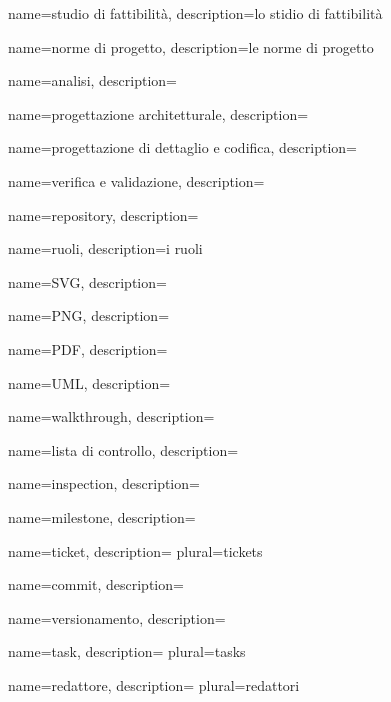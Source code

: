  {
	name=studio di fattibilità,
	description={lo stidio di fattibilità \TODO{}}
}

 {
	name=norme di progetto,
	description={le norme di progetto \TODO{}}
}

 {
	name=analisi,
	description={\TODO{}}
}

 {
	name=progettazione architetturale,
	description={\TODO{}}
}

 {
	name=progettazione di dettaglio e codifica,
	description={\TODO{}}
}

 {
	name=verifica e validazione,
	description={\TODO{}}
}

 {
	name=repository,
	description={\TODO{}}
}

 {
	name=ruoli,
	description={i ruoli\TODO{}}
}

 {
	name=SVG,
	description={\TODO{}}
}

 {
	name=PNG,
	description={\TODO{}}
}

 {
	name=PDF,
	description={\TODO{}}
}

 {
	name=UML,
	description={\TODO{}}
}

 {
	name=walkthrough,
	description={\TODO{}}
}

 {
	name=lista di controllo,
	description={\TODO{}}
}

 {
	name=inspection,
	description={\TODO{}}
}

 {
	name=milestone,
	description={\TODO{}}
}

 {
	name=ticket,
	description={\TODO{}}
	plural=tickets
}

 {
	name=commit,
	description={\TODO{}}
}

 {
	name=versionamento,
	description={\TODO{}}
}

 {
	name=task,
	description={\TODO{}}
	plural=tasks
}

 {
	name=redattore,
	description={\TODO{}}
	plural=redattori
}


